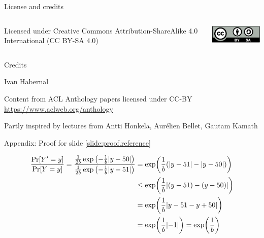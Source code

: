 \documentclass[12pt,aspectratio=169,handout]{beamer}
\begin{document}
\begin{frame}{License and credits}

	\begin{columns}
		\begin{column}{0.7\textwidth}
			Licensed under Creative Commons Attribution-ShareAlike 4.0 International (CC BY-SA 4.0)
		\end{column}
		\begin{column}{0.2\textwidth}
			\includegraphics[width=0.9\linewidth]{img/cc-by-sa-icon.pdf}
		\end{column}
	\end{columns}
	
	\bigskip
	
	Credits
	
	\begin{scriptsize}
		
		Ivan Habernal
		
		Content from ACL Anthology papers licensed under CC-BY \url{https://www.aclweb.org/anthology}
		
		Partly inspired by lectures from Antti Honkela, Aurélien Bellet, Gautam Kamath
	
	\end{scriptsize}
	
\end{frame}



\begin{frame}{Appendix: Proof for slide \ref{slide:proof.reference}}

$$
\begin{aligned}
\frac{\Pr[Y' = y]}{\Pr[Y = y]} =
\frac{
\frac{1}{2b} \exp \left(- \frac{1}{b} \abs{y - 50} \right)
}{
\frac{1}{2b} \exp \left(- \frac{1}{b} \abs{y - 51} \right)
}
&= \exp (\frac{1}{b} ( \abs{y - 51} - \abs{y - 50} ) ) \\
&\leq \exp (\frac{1}{b} \abs{(y - 51) - (y - 50)} ) \\
&= \exp (\frac{1}{b} \abs{y - 51 - y + 50} ) \\
&= \exp (\frac{1}{b} \abs{-1}) = \exp(\frac{1}{b}) \\
\end{aligned}
$$

\end{frame}
\end{document}
